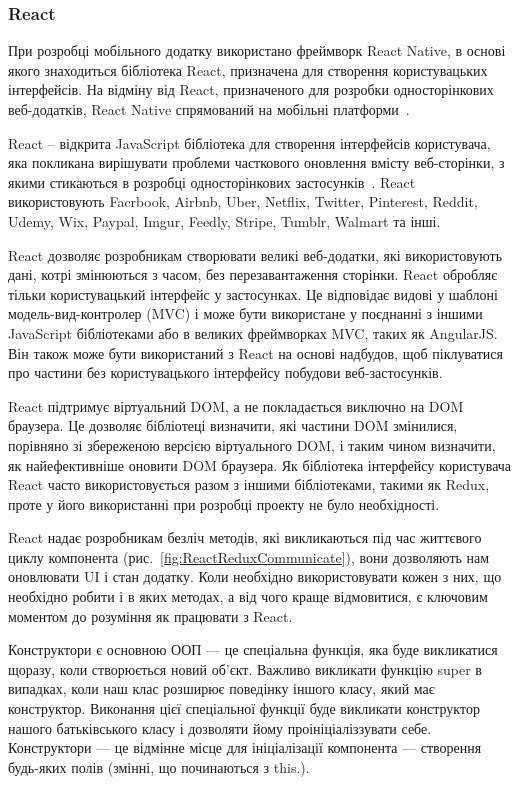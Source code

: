 \subsubsection{React} \label{subs:React}


При розробці мобільного додатку використано фреймворк React Native, в основі якого знаходиться бібліотека React, призначена для створення користувацьких інтерфейсів. На відміну від React, призначеного для розробки односторінкових веб-додатків, React Native спрямований на мобільні платформи~\cite{davidgeary2019}.

React -- відкрита JavaScript бібліотека для створення інтерфейсів користувача, яка покликана вирішувати проблеми часткового оновлення вмісту веб-сторінки, з якими стикаються в розробці односторінкових застосунків~\cite{ericmasiello2017}. React використовують Facrbook, Airbnb, Uber, Netflix, Twitter, Pinterest, Reddit, Udemy, Wix, Paypal, Imgur, Feedly, Stripe, Tumblr, Walmart та інші.

React дозволяє розробникам створювати великі веб-додатки, які використовують дані, котрі змінюються з часом, без перезавантаження сторінки. React обробляє тільки користувацький інтерфейс у застосунках. Це відповідає видові у шаблоні модель-вид-контролер (MVC) і може бути використане у поєднанні з іншими JavaScript бібліотеками або в великих фреймворках MVC, таких як AngularJS. Він також може бути використаний з React на основі надбудов, щоб піклуватися про частини без користувацького інтерфейсу побудови веб-застосунків.

React підтримує віртуальний DOM, а не покладається виключно на DOM браузера. Це дозволяє бібліотеці визначити, які частини DOM змінилися, порівняно зі збереженою версією віртуального DOM, і таким чином визначити, як найефективніше оновити DOM браузера. Як бібліотека інтерфейсу користувача React часто використовується разом з іншими бібліотеками, такими як Redux, проте у його використанні при розробці проекту не було необхідності.

React надає розробникам безліч методів, які викликаються під час життєвого циклу компонента (рис.~\ref{fig:ReactReduxCommunicate}), вони дозволяють нам оновлювати UI і стан додатку. Коли необхідно використовувати кожен з них, що необхідно робити і в яких методах, а від чого краще відмовитися, є ключовим моментом до розуміння як працювати з React.


Конструктори є основною ООП — це спеціальна функція, яка буде викликатися щоразу, коли створюється новий об'єкт. Важливо викликати функцію super в випадках, коли наш клас розширює поведінку іншого класу, який має конструктор. Виконання цієї спеціальної функції буде викликати конструктор нашого батьківського класу і дозволяти йому проініціаліззувати себе. 
Конструктори —  це відмінне місце для ініціалізації компонента —  створення будь-яких полів (змінні, що починаються з this.).

